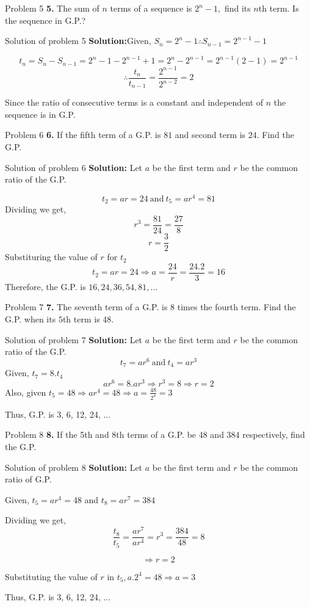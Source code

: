 \documentclass[aspectratio=1610,8pt]{beamer}
\begin{document}
\begin{frame}{Problem 5}
  \textbf{5.} The sum of $n$ terms of a sequence is $2^n - 1,$ find its $n$th
  term. Is the sequence in G.P.?
\end{frame}
\begin{frame}{Solution of problem 5}
  \textbf{Solution:}Given, $S_n = 2^n - 1 \therefore S_{n - 1} = 2^{n - 1} - 1$

  $$t_n = S_n - S_{n - 1} = 2^n - 1 - 2^{n - 1} + 1 = 2^n - 2^{n - 1} = 2^{n -
    1}(2 -1) = 2^{n - 1}$$
  $$\therefore \frac{t_n}{t_{n - 1}} = \frac{2^{n - 1}}{2^{n - 2}} = 2$$

  Since the ratio of consecutive terms is a constant and independent of $n$ the
  sequence is in G.P.
\end{frame}
\begin{frame}{Problem  6}
  \textbf{6.} If the fifth term of a G.P. is $81$ and second term is $24$. Find
  the G.P.
\end{frame}
\begin{frame}{Solution of problem 6}
  \textbf{Solution:} Let $a$ be the first term and $r$ be the common ratio of
  the G.P.

  $$t_2 = ar = 24~\text{and}~t_5 = ar^4 = 81$$
  Dividing we get, $$r^3 = \frac{81}{24} = \frac{27}{8}$$
  $$r = \frac{3}{2}$$
  Substituring the value of $r$ for $t_2$
  $$t_2 = ar = 24 \Rightarrow a = \frac{24}{r} = \frac{24.2}{3} = 16$$
  Therefore, the G.P. is $16, 24, 36, 54, 81, \ldots$
\end{frame}
\begin{frame}{Problem 7}
 \textbf{7.} The seventh term of a G.P. is $8$ times the fourth term. Find the
 G.P. when its $5$th term is 48.
\end{frame}
\begin{frame}{Solution of problem 7}
  \textbf{Solution:} Let $a$ be the first term and $r$ be the common ratio of
  the G.P.
  $$t_7 = ar^6~\text{and}~t_4 = ar^3$$
  Given, $t_7 = 8. t_4$
  $$ar^6 = 8.ar^3\Rightarrow r^3 = 8 \Rightarrow r = 2$$
  Also, given $t_5 = 48 \Rightarrow ar^4 = 48 \Rightarrow a = \frac{48}{2^4} =
  3$
  
  Thus, G.P. is 3, 6, 12, 24, ...
\end{frame}
\begin{frame}{Problem 8}
  \textbf{8.} If the 5th and 8th terms of a G.P. be 48 and 384 respectively,
  find the G.P.
\end{frame}
\begin{frame}{Solution of problem 8}
  \textbf{Solution:} Let $a$ be the first term and $r$ be the common ratio of
  G.P.

  Given, $t_5 = ar^4 = 48$ and $t_8 = ar^7 = 384$

  Dividing we get, $$\frac{t_8}{t_5} = \frac{ar^7}{ar^4} = r^3 =
  \frac{384}{48} = 8$$

  $$\Rightarrow r = 2$$

  Substituting the value of $r$ in $t_5, a.2^4 = 48 \Rightarrow a = 3$

  Thus, G.P. is 3, 6, 12, 24, ...
\end{frame}
\end{document}

